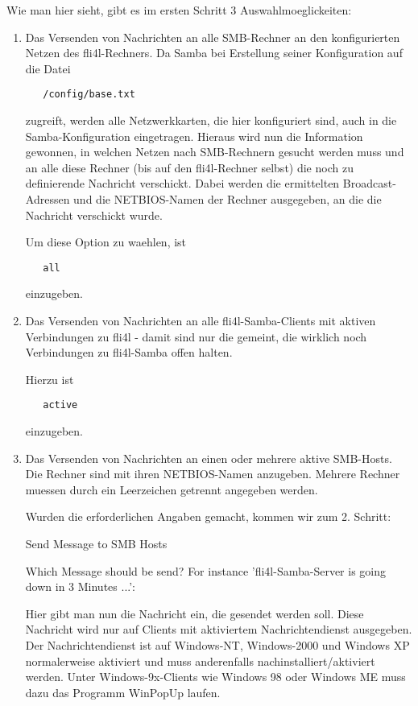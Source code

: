 Wie man hier sieht, gibt es im ersten Schritt 3 Auswahlmoeglickeiten:

\begin{enumerate}
\item
Das Versenden von Nachrichten an alle SMB-Rechner an den konfigurierten Netzen
des fli4l-Rechners. Da Samba bei Erstellung seiner Konfiguration auf die Datei

\begin{example}
\begin{verbatim}
   /config/base.txt
\end{verbatim}
\end{example}

zugreift, werden alle Netzwerkkarten, die hier konfiguriert sind, auch in die
Samba-Konfiguration eingetragen. Hieraus wird nun die Information gewonnen, in
welchen Netzen nach SMB-Rechnern gesucht werden muss und an alle diese Rechner
(bis auf den fli4l-Rechner selbst) die noch zu definierende Nachricht verschickt.
Dabei werden die ermittelten Broadcast-Adressen und die NETBIOS-Namen der
Rechner ausgegeben, an die die Nachricht verschickt wurde.

Um diese Option zu waehlen, ist

\begin{example}
\begin{verbatim}
   all
\end{verbatim}
\end{example}

einzugeben.

\item
Das Versenden von Nachrichten an alle fli4l-Samba-Clients mit aktiven
Verbindungen zu fli4l - damit sind nur die gemeint, die wirklich noch
Verbindungen zu fli4l-Samba offen halten.

Hierzu ist

\begin{example}
\begin{verbatim}
   active
\end{verbatim}
\end{example}

einzugeben.

\item
Das Versenden von Nachrichten an einen oder mehrere aktive SMB-Hosts.
Die Rechner sind mit ihren NETBIOS-Namen anzugeben. Mehrere Rechner muessen
durch ein Leerzeichen getrennt angegeben werden.


Wurden die erforderlichen Angaben gemacht, kommen wir zum 2. Schritt:

Send Message to SMB Hosts


Which Message should be send?
For instance 'fli4l-Samba-Server is going down in 3 Minutes ...':

Hier gibt man nun die Nachricht ein, die gesendet werden soll.
Diese Nachricht wird nur auf Clients mit aktiviertem Nachrichtendienst
ausgegeben. Der Nachrichtendienst ist auf Windows-NT, Windows-2000 und
Windows XP normalerweise aktiviert und muss anderenfalls
nachinstalliert/aktiviert werden.
Unter Windows-9x-Clients wie Windows 98 oder Windows ME muss dazu das
Programm WinPopUp laufen.


\end{enumerate}


